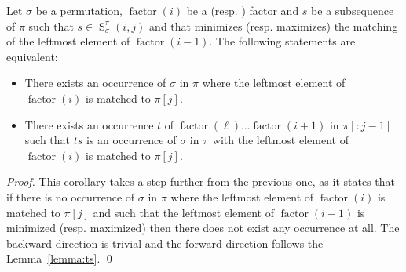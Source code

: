 \documentclass[a4paper]{llncs}
\newcommand{\RLMin}{\text{RLMin}}
\newcommand{\RLMax}{\text{RLMax}}
\newcommand{\ptext}{\pi}
\newcommand{\ppattern}{\sigma}
\DeclareMathOperator{\factor}{factor}
\DeclareMathOperator{\SETa}{S}
\newcommand{\SET}[4]{\SETa_{{#1}}^{{#2}}({#3},{#4})}
\begin{document}
\begin{corollary}
\label{corollary:we can chose a matching}
Let $\ppattern$ be a permutation,
$\factor(i)$ be a \RLMin (resp. \RLMax) factor
and
$s$ be a subsequence of $\pi$ such that $s \in \SET{\ppattern}{\ptext}{i}{j}$ and
that minimizes (resp. maximizes) the matching of the leftmost element of $\factor(i-1)$.
The following statements are equivalent:
\begin{itemize}
	\item There exists an occurrence
	 of $\ppattern$ in $\ptext$ where the leftmost element of $\factor(i)$ is matched to $\ptext[j]$.
	\item There exists an occurrence $t$ of $\factor(\ell)\ldots \factor(i+1)$ in $\ptext[:j-1]$  such that $ts$ is an occurrence of $\ppattern$ in $\ptext$ with the leftmost element of $\factor(i)$ is matched to $\ptext[j]$.
\end{itemize}
\end{corollary}

\begin{proof} %
This corollary takes a step further from the previous one, as it states that if there is no occurrence of $\ppattern$ in $\ptext$ where the leftmost element of $\factor(i)$ is matched to $\ptext[j]$ and such that
the leftmost element of $\factor(i-1)$ is minimized (resp. maximized)
then there does not exist any occurrence at all. The backward direction is trivial and the forward direction follows the Lemma~\ref{lemma:ts}.
\qed
\end{proof}


%
%
%
%



\end{document}

